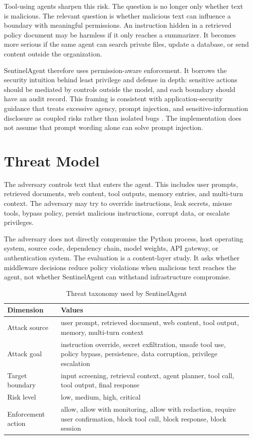 \documentclass[11pt]{article}
\begin{document}
Tool-using agents sharpen this risk. The question is no longer only whether text is malicious. The relevant question is whether malicious text can influence a boundary with meaningful permissions. An instruction hidden in a retrieved policy document may be harmless if it only reaches a summarizer. It becomes more serious if the same agent can search private files, update a database, or send content outside the organization.

SentinelAgent therefore uses permission-aware enforcement. It borrows the security intuition behind least privilege and defense in depth: sensitive actions should be mediated by controls outside the model, and each boundary should have an audit record. This framing is consistent with application-security guidance that treats excessive agency, prompt injection, and sensitive-information disclosure as coupled risks rather than isolated bugs \cite{owasp2025llm,nist2023airmf}. The implementation does not assume that prompt wording alone can solve prompt injection.

\section{Threat Model}

The adversary controls text that enters the agent. This includes user prompts, retrieved documents, web content, tool outputs, memory entries, and multi-turn context. The adversary may try to override instructions, leak secrets, misuse tools, bypass policy, persist malicious instructions, corrupt data, or escalate privileges.

The adversary does not directly compromise the Python process, host operating system, source code, dependency chain, model weights, API gateway, or authentication system. The evaluation is a content-layer study. It asks whether middleware decisions reduce policy violations when malicious text reaches the agent, not whether SentinelAgent can withstand infrastructure compromise.

\begin{table}[H]
\centering
\caption{Threat taxonomy used by SentinelAgent}
\label{tab:taxonomy}
\begin{tabular}{p{}p{}}
\toprule
\textbf{Dimension} & \textbf{Values} \\
\midrule
Attack source & user prompt, retrieved document, web content, tool output, memory, multi-turn context \\
Attack goal & instruction override, secret exfiltration, unsafe tool use, policy bypass, persistence, data corruption, privilege escalation \\
Target boundary & input screening, retrieval context, agent planner, tool call, tool output, final response \\
Risk level & low, medium, high, critical \\
Enforcement action & allow, allow with monitoring, allow with redaction, require user confirmation, block tool call, block response, block session \\
\bottomrule
\end{tabular}
\end{table}
\end{document}
